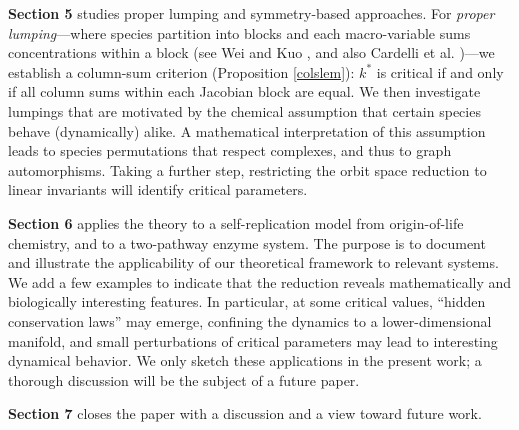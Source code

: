\documentclass{article}
\begin{document}
\textbf{Section 5} studies proper lumping and symmetry-based approaches. For \emph{proper lumping}---where species partition into blocks and each macro-variable sums concentrations within a block (see Wei and Kuo \cite{WK1969a}, and also Cardelli et al. \cite{CardelliTTV2017})---we establish a  column-sum criterion (Proposition \ref{colslem}): $k^*$ is critical if and only if all column sums within each Jacobian block are equal. We then investigate lumpings that are motivated by the chemical assumption that certain species behave (dynamically) alike. A mathematical interpretation of this assumption leads to species permutations that respect complexes, and thus to graph automorphisms. Taking a further step, restricting the orbit space reduction to linear invariants will identify critical parameters. 

\textbf{Section 6} applies the theory to a self-replication model from origin-of-life chemistry, and to a two-pathway enzyme system. The purpose is to document and illustrate the applicability of our theoretical framework to relevant systems. We add a few examples to indicate that the reduction reveals mathematically and biologically interesting features. In particular, at some critical values, ``hidden conservation laws'' may emerge, confining the dynamics to a lower-dimensional manifold, and small perturbations of critical parameters may lead to interesting dynamical behavior. We only sketch these applications in the present work; a thorough discussion will be the subject of a future paper. 

\textbf{Section 7} closes the paper with a discussion and a view toward future work.

\end{document}
